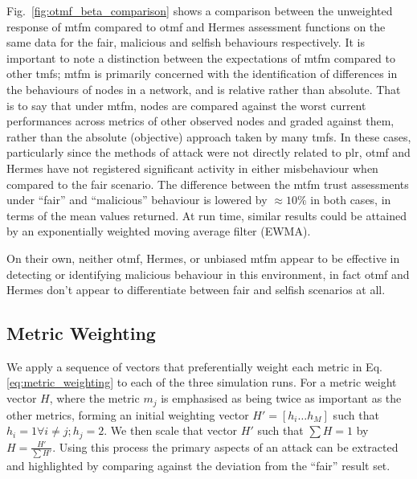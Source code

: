 Fig.~\ref{fig:otmf_beta_comparison} shows a comparison between the unweighted response of \gls{mtfm} compared to \gls{otmf} and Hermes assessment functions on the same data for the fair, malicious and selfish behaviours respectively.
It is important to note a distinction between the expectations of \gls{mtfm} compared to other \glspl{tmf}; \gls{mtfm} is primarily concerned with the identification of differences in the behaviours of nodes in a network, and is relative rather than absolute.
That is to say that under \gls{mtfm}, nodes are compared against the worst current performances across metrics of other observed nodes and graded against them, rather than the absolute (objective) approach taken by many \glspl{tmf}.
In these cases, particularly since the methods of attack were not directly related to \gls{plr}, \gls{otmf} and Hermes have not registered significant activity in either misbehaviour when compared to the fair scenario.
The difference between the \gls{mtfm} trust assessments under ``fair'' and ``malicious'' behaviour is lowered by $\approx 10\%$ in both cases, in terms of the mean values returned.
At run time, similar results could be attained by an exponentially weighted moving average filter (EWMA).

On their own, neither \gls{otmf}, Hermes, or unbiased \gls{mtfm} appear to be effective in detecting or identifying malicious behaviour in this environment, in fact \gls{otmf} and Hermes don't appear to differentiate between fair and selfish scenarios at all.


\subsection{Metric Weighting}\label{sec:metric_weighting}
%

We apply a sequence of vectors that preferentially weight each metric in Eq. \eqref{eq:metric_weighting} to each of the three simulation runs.
For a metric weight vector $H$, where the metric $m_j$ is emphasised as being twice as important as the other metrics, forming an initial weighting vector $H'=[h_i\dots h_M]$ such that $h_i = 1 \forall i \ne j; h_j=2$.
We then scale that vector $H'$ such that $\sum H = 1$ by $H= \frac{H'}{\sum H'}$.
Using this process the primary aspects of an attack can be extracted and highlighted by comparing against the deviation from the ``fair'' result set. 

